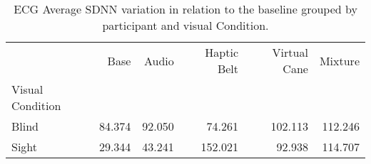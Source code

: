 
\begin{table}[!htb]
\centering
\caption{ECG Average SDNN variation in relation to the baseline grouped by participant and visual Condition.}
\label{tab:ecg_sdnn_variation_group}
\begin{tabular}{lrrrrr}
\toprule
{} &   Base &  Audio &  Haptic Belt &  Virtual Cane &  Mixture \\
Visual Condition &        &        &              &               &          \\
\midrule
Blind            & 84.374 & 92.050 &       74.261 &       102.113 &  112.246 \\
Sight            & 29.344 & 43.241 &      152.021 &        92.938 &  114.707 \\
\bottomrule
\end{tabular}
\end{table}

